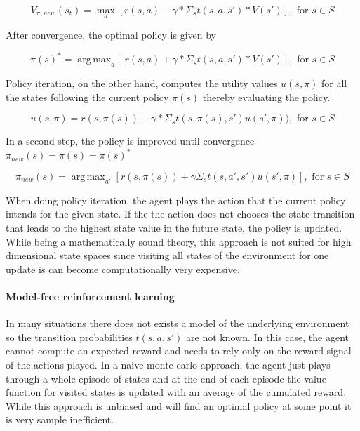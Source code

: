 \documentclass[10pt]{reportMaster}
\DeclareMathOperator*{\argmax}{arg\,max}
\begin{document}
\begin{equation}
\label{eq:BellmanUpdateValueFunctionModelBased}
V_{\pi, new}(s_{t})= \max_{a}[r(s, a) + \gamma * \Sigma_{s}t(s, a, s')*V(s')], \text{ for } s \in S
\end{equation}

After convergence, the optimal policy is given by 

\begin{equation}
\label{eq:BellmanUpdateValueFunctionModelBasedconvergence}
\pi(s)^{*}= \argmax_{a}[r(s, a) + \gamma * \Sigma_{s}t(s, a, s')*V(s')], \text{ for } s \in S
\end{equation}

Policy iteration, on the other hand, computes the utility values $u(s, \pi)$ for all the states following the current policy $\pi(s)$ thereby evaluating the policy. 

\begin{equation}
\label{eq:utility value}
u(s, \pi) = r(s, \pi(s)) + \gamma * \Sigma_{s}t(s, \pi(s), s')u(s', \pi)), \text{ for } s \in S
\end{equation}

In a second step, the policy is improved until convergence $\pi_{new}(s) =\pi(s) = \pi(s)^{*}$

\begin{equation}
\label{eq:optimalpoliciy}
\pi_{new}(s) = \argmax_{a'}[r(s, \pi(s)) + \gamma \Sigma_{s}t(s, a', s') u(s', \pi)],  \text{ for } s \in S
\end{equation}


When doing policy iteration, the agent plays the action that the current policy intends for the given state. If the the action does not chooses the state transition that leads to the highest state value in the future state, the policy is updated. While being a mathematically sound theory, this approach is not suited for high dimensional state spaces since visiting all states of the environment for one update is can become computationally very expensive.

\paragraph{Model-free reinforcement learning} In many situations there does not exists a model of the underlying environment so the transition probabilities $t(s, a, s')$ are not known. In this case, the agent cannot compute an expected reward and needs to rely only on the reward signal of the actions played. In a naive monte carlo approach, the agent just plays through a whole episode of states and at the end of each episode the value function for visited states is updated with an average of the cumulated reward. While this approach is unbiased and will find an optimal policy at some point it is very sample inefficient.  
\end{document}

